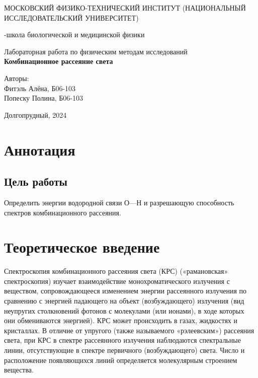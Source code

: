 \documentclass[a4paper,12pt]{article} %
\begin{document}
\begin{titlepage}
\begin{center}
    {\large МОСКОВСКИЙ ФИЗИКО-ТЕХНИЧЕСКИЙ ИНСТИТУТ (НАЦИОНАЛЬНЫЙ ИССЛЕДОВАТЕЛЬСКИЙ УНИВЕРСИТЕТ)}
\end{center}
\begin{center}
    {-школа биологической и медицинской физики}
\end{center}


    \vspace{7cm}


\vspace{0.1cm}
{\huge
\begin{center}
    {Лабораторная работа по физическим методам исследований}\\
    {\bf Комбинационное рассеяние света}
\end{center}
}
\vspace{4cm}
\begin{flushright}
{\LARGE Авторы:\\ Фитэль Алёна, Б06-103\\ Попеску Полина, Б06-103 \\ }

\end{flushright}
\vspace{4cm}
\begin{center}
    Долгопрудный, 2024
\end{center}
\end{titlepage}
\newpage

\section{Аннотация}
\subsection{Цель работы}
Определить
энергии водородной связи О---Н и разрешающую способность спектров комбинационного рассеяния.
\section{Теоретическое введение}
Спектроскопия комбинационного рассеяния света (КРС) («рамановская» спектроскопия) изучает взаимодействие монохроматического
излучения с веществом, сопровождающееся изменением энергии рассеянного
излучения по сравнению с энергией падающего на объект (возбуждающего)
излучения (вид
неупругих столкновений фотонов с молекулами (или ионами), в ходе которых
они обмениваются энергией). КРС может происходить в газах,
жидкостях и кристаллах. В отличие от упругого (также называемого
«рэлеевским») рассеяния света, при КРС в спектре рассеянного излучения
наблюдаются спектральные линии, отсутствующие в спектре первичного
(возбуждающего) света. Число и расположение появляющихся линий
определяется молекулярным строением вещества.
\end{document}
